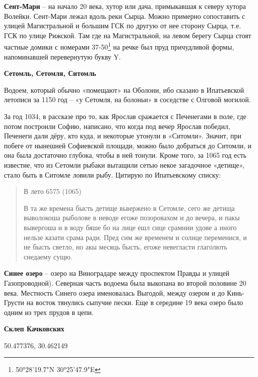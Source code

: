 \textbf{Сент-Мари} – на начало 20 века, хутор или дача, примыкавшая к северу хутора Волейки. Сент-Мари лежал вдоль реки Сырца. Можно примерно сопоставить с улицей Магистральной и большим ГСК по другую от нее сторону Сырца, т.е. ГСК по улице Рижской. Там где на Магистральной, на левом берегу Сырца стоят частные домики с номерами 37-50\footnote{50°28'19.7"N 30°25'47.9"E} на речке был пруд причудливой формы, напоминавшей перевернутую букву Y.\\

\medskip

\textbf{Сетомль, Сетомля, Ситомль} 

Водоем, который обычно «помещают» на Оболони, ибо сказано в Ипатьевской летописи за 1150 год – «у Сетомля, на болоньи» в соседстве с Олговой могилой. 

За год 1034, в рассказе про то, как Ярослав сражается с Печенегами в поле, где потом построили Софию, написано, что когда под вечер Ярослав победил, Печенеги дали дёру, кто куда, и некоторые утонули в «Ситомли». Значит, при побеге от нынешней Софиевской площади, можно было добраться до Ситомли, и она была достаточно глубока, чтобы в ней тонули. Кроме того, за 1065 год есть известие, что из Сетомли рыбаки вытащили сетью некое загадочное «детище», стало быть в Ситомле ловили рыбу. Цитирую по Ипатьевскому списку:

\begin{quotation}
В лето 6575 (1065)

В та же времена бысть детище вьвержено в Сетомле, сего же детища выволокоша рыболове в неводе егоже позоровахом и до вечера, и пакы вывергоша и в воду бяше бо на лице ешл сице срамнии удове а иного нельзе казати срама ради. Пред сим же временем и солнце переменися, и не бысть светло, но акы месяць бысть, егоже невегласти глаголють снедаему сущю.
\end{quotation}

\medskip

\textbf{Синее озеро} – озеро на Виноградаре между проспектом Правды и улицей Газопроводной). Северная часть водоема была выкопана во второй половине 20 века. Местность Синего озера именовалась Выгодой, между озером и до Кинь-Грусти на восток тянулись сыпучие пески. Еще в середине 19 века озеро было одним из трех прудов в цепи.\\

\medskip

\textbf{Склеп Качковских}

50.477376, 30.462149

